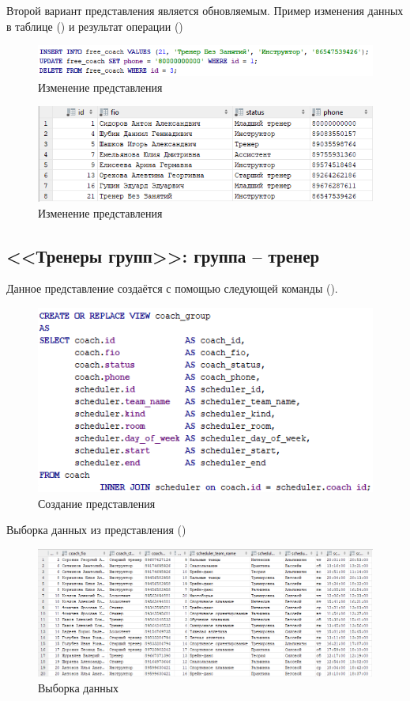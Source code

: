 \documentclass[a4paper,14pt]{article}
\begin{document}
	Второй вариант представления является обновляемым.
	Пример изменения данных в таблице () и результат операции ()

	\begin{figure}[H]
		\centering		
		\includegraphics[width=0.9\linewidth]{image/viewChange_01}
		\caption{Изменение представления}\label{img:viewChange_01}
	\end{figure}

	\begin{figure}[H]
		\centering		
		\includegraphics[width=0.7\linewidth]{image/viewResult_01}
		\caption{Изменение представления}\label{img:viewResult_01}
	\end{figure}

\subsection{<<Тренеры групп>>: группа – тренер}

	Данное представление создаётся с помощью следующей команды ().
	
	\begin{figure}[H]
		\centering		
		\includegraphics[width=0.6\linewidth]{image/viewCreate_02}
		\caption{Создание представления}\label{img:viewCreate_02}
	\end{figure}
	
	Выборка данных из представления ()
	
	\begin{figure}[H]
		\centering		
		\includegraphics[width=\linewidth]{image/viewSelect_02}
		\caption{Выборка данных}\label{img:viewSelect_02}
	\end{figure}
	
\end{document}
